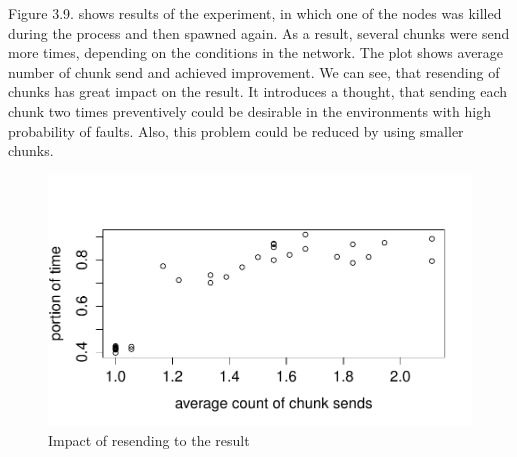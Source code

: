 Figure 3.9. shows results of the experiment, in which one of the nodes
was killed during the process and then spawned again. As a result,
several chunks were send more times, depending on the conditions in the
network. The plot shows average number of chunk send and achieved
improvement. We can see, that resending of chunks has great impact on
the result. It introduces a thought, that sending each chunk two times
preventively could be desirable in the environments with high
probability of faults. Also, this problem could be reduced by using
smaller chunks.

\begin{figure}[h]
\begin{center}
\includegraphics[scale=0.90]{./img/failures.pdf}
\caption{Impact of resending to the result}
\end{center}
\end{figure}
